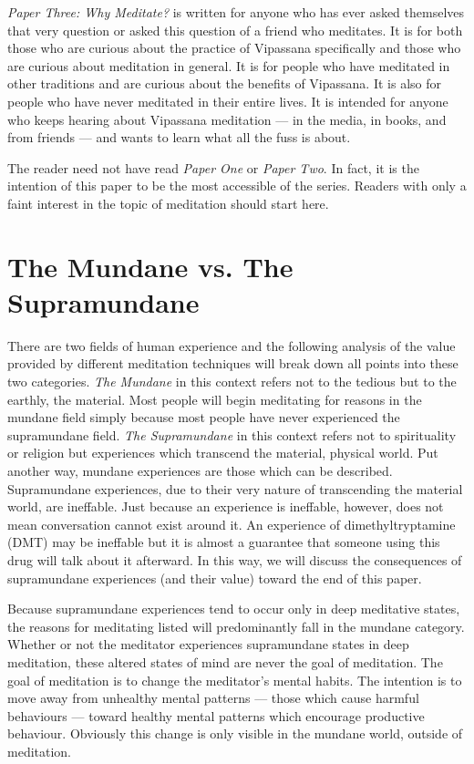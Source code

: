 \documentclass[a4paper, amsfonts, amssymb, amsmath, reprint, showkeys, nofootinbib, twoside]{revtex4-1}
\begin{document}
\textit{Paper Three: Why Meditate?} is written for anyone who has ever asked
themselves that very question or asked this question of a friend who
meditates. It is for both those who are curious about the practice of Vipassana
specifically and those who are curious about meditation in general. It is for people
who have meditated in other traditions and are curious about the benefits of
Vipassana. It is also for people who have never meditated in their entire lives. It
is intended for anyone who keeps hearing about Vipassana meditation --- in the media,
in books, and from friends --- and wants to learn what all the fuss is about.

The reader need not have read \textit{Paper One} or \textit{Paper Two}. In fact, it
is the intention of this paper to be the most accessible of the series. Readers
with only a faint interest in the topic of meditation should start here.


\section{The Mundane vs. The Supramundane}

There are two fields of human experience and the following analysis of the value
provided by different meditation techniques will break down all points into these two
categories. \textit{The Mundane}
in this context refers not to the tedious but to the earthly, the material. Most people will begin
meditating for reasons in the mundane field simply because most people have never
experienced the supramundane field. \textit{The Supramundane} in this context refers not to
spirituality or religion but experiences which transcend the material, physical
world. Put another way, mundane experiences are those which can be
described. Supramundane experiences, due to their very nature of transcending the
material world, are ineffable. Just because an experience is ineffable, however, does
not mean conversation cannot exist around it. An experience of dimethyltryptamine
(DMT) may be ineffable but it is almost a guarantee that someone using this drug will
talk about it afterward. In this way, we will discuss the consequences of
supramundane experiences (and their value) toward the end of this paper.

Because supramundane experiences tend to occur only in deep meditative states,
the reasons for meditating listed will predominantly fall in the mundane
category. Whether or not the meditator experiences supramundane states in deep
meditation, these altered states of mind are never the goal of meditation. The goal
of meditation is to change the meditator's mental habits. The intention is to move away from unhealthy
mental patterns --- those which cause harmful behaviours --- toward healthy mental patterns which
encourage productive behaviour. Obviously this change is only visible in the mundane
world, outside of meditation.
\end{document}
